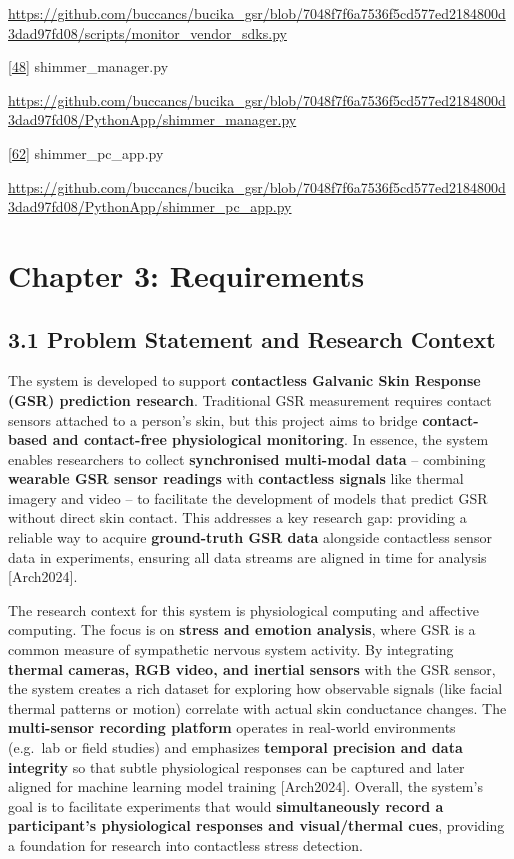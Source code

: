 \documentclass[12pt,a4paper]{article}
\begin{document}
\url{https://github.com/buccancs/bucika_gsr/blob/7048f7f6a7536f5cd577ed2184800d3dad97fd08/scripts/monitor_vendor_sdks.py}

\href{https://github.com/buccancs/bucika_gsr/blob/7048f7f6a7536f5cd577ed2184800d3dad97fd08/PythonApp/shimmer_manager.py\#L19-L27}{{[}48{]}} shimmer\_manager.py

\url{https://github.com/buccancs/bucika_gsr/blob/7048f7f6a7536f5cd577ed2184800d3dad97fd08/PythonApp/shimmer_manager.py}

\href{https://github.com/buccancs/bucika_gsr/blob/7048f7f6a7536f5cd577ed2184800d3dad97fd08/PythonApp/shimmer_pc_app.py\#L170-L178}{{[}62{]}} shimmer\_pc\_app.py

\url{https://github.com/buccancs/bucika_gsr/blob/7048f7f6a7536f5cd577ed2184800d3dad97fd08/PythonApp/shimmer_pc_app.py}

\newpage

\section{Chapter 3: Requirements}\label{chapter-3-requirements}

\subsection{3.1 Problem Statement and Research Context}\label{problem-statement-and-research-context}

The system is developed to support \textbf{contactless Galvanic Skin Response (GSR) prediction research}. Traditional GSR measurement requires contact sensors attached to a person's skin, but this project aims to bridge \textbf{contact-based and contact-free physiological monitoring}. In essence, the system enables researchers to collect \textbf{synchronised multi-modal data} -- combining \textbf{wearable GSR sensor readings} with \textbf{contactless signals} like thermal imagery and video -- to facilitate the development of models that predict GSR without direct skin contact. This addresses a key research gap: providing a reliable way to acquire \textbf{ground-truth GSR data} alongside contactless sensor data in experiments, ensuring all data streams are aligned in time for analysis {[}Arch2024{]}.

The research context for this system is physiological computing and affective computing. The focus is on \textbf{stress and emotion analysis}, where GSR is a common measure of sympathetic nervous system activity. By integrating \textbf{thermal cameras, RGB video, and inertial sensors} with the GSR sensor, the system creates a rich dataset for exploring how observable signals (like facial thermal patterns or motion) correlate with actual skin conductance changes. The \textbf{multi-sensor recording platform} operates in real-world environments (e.g.~lab or field studies) and emphasizes \textbf{temporal precision and data integrity} so that subtle physiological responses can be captured and later aligned for machine learning model training {[}Arch2024{]}. Overall, the system's goal is to facilitate experiments that would \textbf{simultaneously record a participant's physiological responses and visual/thermal cues}, providing a foundation for research into contactless stress detection.
\end{document}

